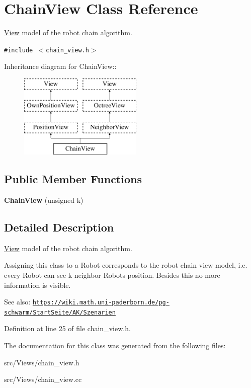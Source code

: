 \hypertarget{class_chain_view}{
\section{ChainView Class Reference}
\label{class_chain_view}
}
\hyperlink{class_view}{View} model of the robot chain algorithm.  


{\tt \#include $<$chain\_\-view.h$>$}

Inheritance diagram for ChainView::\begin{figure}[H]
\begin{center}
\leavevmode
\includegraphics[height=4cm]{class_chain_view}
\end{center}
\end{figure}
\subsection*{Public Member Functions}
\begin{CompactItemize}
\item 
\hypertarget{class_chain_view_c234fecf204d749c81737a71a51f98db}{
\textbf{ChainView} (unsigned k)}
\label{class_chain_view_c234fecf204d749c81737a71a51f98db}

\end{CompactItemize}


\subsection{Detailed Description}
\hyperlink{class_view}{View} model of the robot chain algorithm. 

Assigning this class to a Robot corresponds to the robot chain view model, i.e. every Robot can see k neighbor Robots position. Besides this no more information is visible.

\begin{Desc}
\item[See also:]\href{https://wiki.math.uni-paderborn.de/pg-schwarm/StartSeite/AK/Szenarien}{\tt https://wiki.math.uni-paderborn.de/pg-schwarm/StartSeite/AK/Szenarien} \end{Desc}


Definition at line 25 of file chain\_\-view.h.

The documentation for this class was generated from the following files:\begin{CompactItemize}
\item 
src/Views/chain\_\-view.h\item 
src/Views/chain\_\-view.cc\end{CompactItemize}
